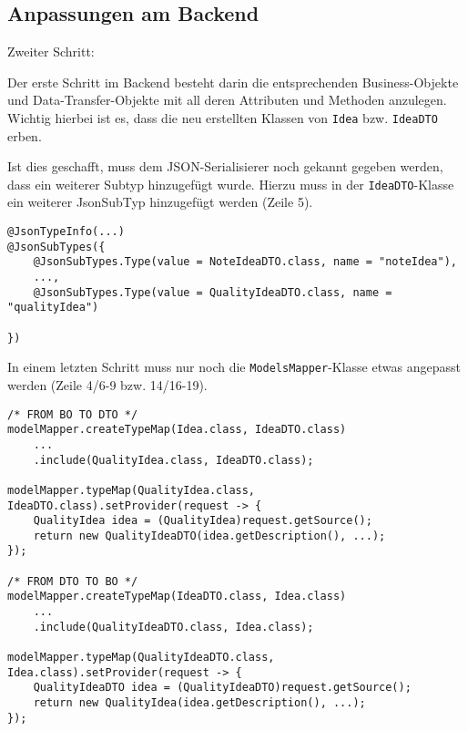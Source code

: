 \subsection{Anpassungen am Backend}
\begin{labeling}{Zweiter Schritt:}
	\item [Erster Schritt:] Der erste Schritt im Backend besteht darin die entsprechenden Business-Objekte und Data-Transfer-Objekte mit all deren Attributen und Methoden anzulegen. Wichtig hierbei ist es, dass die neu erstellten Klassen von \texttt{Idea} bzw. \texttt{IdeaDTO} erben.
	\item [Zweiter Schritt:] Ist dies geschafft, muss dem JSON-Serialisierer noch gekannt gegeben werden, dass ein weiterer Subtyp hinzugefügt wurde. Hierzu muss in der \texttt{IdeaDTO}-Klasse ein weiterer JsonSubTyp hinzugefügt werden (Zeile 5).
	
\begin{lstlisting}[caption={Weiterer Ideen-Typ hinzufügen in der IdeaDTO-Klasse}, label=addIdeaType]
@JsonTypeInfo(...)
@JsonSubTypes({
    @JsonSubTypes.Type(value = NoteIdeaDTO.class, name = "noteIdea"),
    ...,
    @JsonSubTypes.Type(value = QualityIdeaDTO.class, name = "qualityIdea")
        
})
\end{lstlisting}

	\item [Dritter Schritt:] In einem letzten Schritt muss nur noch die \texttt{ModelsMapper}-Klasse etwas angepasst werden (Zeile 4/6-9 bzw. 14/16-19). 

\begin{lstlisting}[caption={Weiterer Ideen-Typ hinzufügen in der ModelsMapper-Klasse}]
/* FROM BO TO DTO */
modelMapper.createTypeMap(Idea.class, IdeaDTO.class)
    ...
    .include(QualityIdea.class, IdeaDTO.class);

modelMapper.typeMap(QualityIdea.class, IdeaDTO.class).setProvider(request -> {
    QualityIdea idea = (QualityIdea)request.getSource();
    return new QualityIdeaDTO(idea.getDescription(), ...);
});

/* FROM DTO TO BO */
modelMapper.createTypeMap(IdeaDTO.class, Idea.class)
    ...
    .include(QualityIdeaDTO.class, Idea.class);

modelMapper.typeMap(QualityIdeaDTO.class, Idea.class).setProvider(request -> {
    QualityIdeaDTO idea = (QualityIdeaDTO)request.getSource();
    return new QualityIdea(idea.getDescription(), ...);
});
\end{lstlisting}
\end{labeling}

